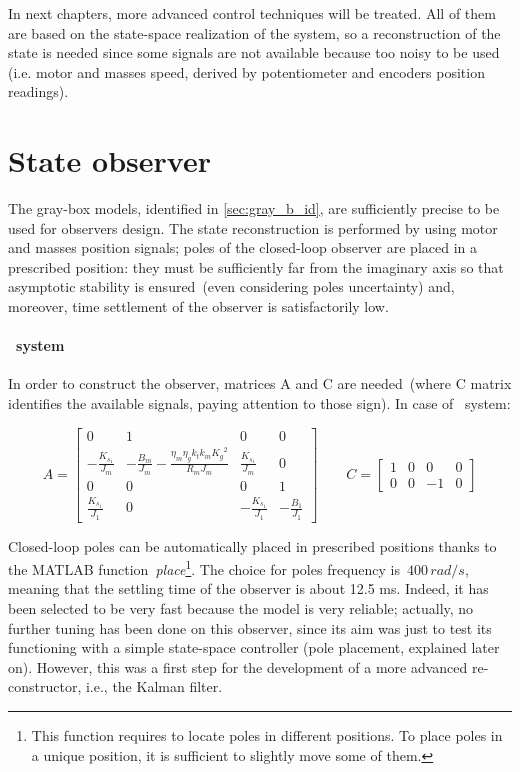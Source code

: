 
In next chapters, more advanced control techniques will be treated. All of them are based on the state-space realization of the system, so a reconstruction of the state is needed since some signals are not available because too noisy to be used (i.e. motor and masses speed, derived by potentiometer and encoders position readings).

\section{State observer}

The gray-box models, identified in \cref{sec:gray_b_id}, are sufficiently precise to be used for observers design. The state reconstruction is performed by using motor and masses position signals; poles of the closed-loop observer are placed in a prescribed position: they must be sufficiently far from the imaginary axis so that asymptotic stability is ensured~(even considering poles uncertainty) and, moreover, time settlement of the observer is satisfactorily low.

\paragraph{\onedof\ system}

In order to construct the observer, matrices A and C are needed~(where C matrix identifies the available signals, paying attention to those sign). In case of \onedof\ system:

\begin{equation}
	A = 
	\begin{bmatrix}
		0 &1 & 0 & 0 \\
		-\frac{K_{s_1}}{J_m} & -\frac{B_m}{J_m}-\frac{\eta_m \eta_g k_t k_m {K_g}^2}{R_m J_m}  & \frac{K_{s_1}}{J_m} & 0 \\
		0 & 0 & 0 & 1 \\
		\frac{K_{s_1}}{J_1} & 0 & -\frac{K_{s_1}}{J_1} & -\frac{B_1}{J_1}
	\end{bmatrix}
	\qquad
	C =
	\begin{bmatrix}
		1 & 0 & 0 & 0 \\
		0 & 0 & -1 & 0
	\end{bmatrix}
\label{eqn:1dof_mat_obs}
\end{equation}

Closed-loop poles can be automatically placed in prescribed positions thanks to the MATLAB function~\textit{place}\footnote{This function requires to locate poles in different positions. To place poles in a unique position, it is sufficient to slightly move some of them.}.
The choice for poles frequency is~$400\, rad/s$, meaning that the settling time of the observer is about 12.5 ms. Indeed, it has been selected to be very fast because the model is very reliable; actually, no further tuning has been done on this observer, since its aim was just to test its functioning with a simple state-space controller (pole placement, explained later on). However, this was a first step for the development of a more advanced re-constructor, i.e., the Kalman filter.

